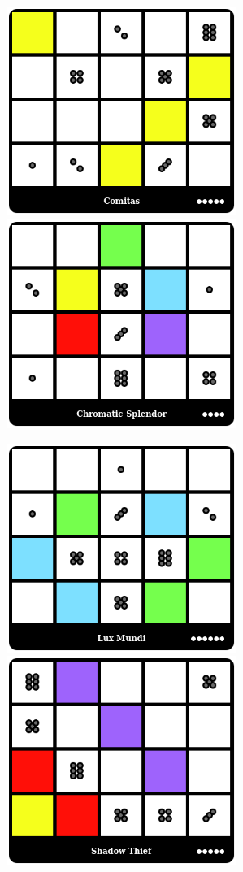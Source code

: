 \centerline{\mbox{\includegraphics[width=75mm]{img/WPC/Comitas.png}\includegraphics[width=75mm]{img/WPC/ChromaticSplendor.png}}}
\centerline{\mbox{\includegraphics[width=75mm]{img/WPC/LuxMundi.png}\includegraphics[width=75mm]{img/WPC/ShadowThief.png}}}
